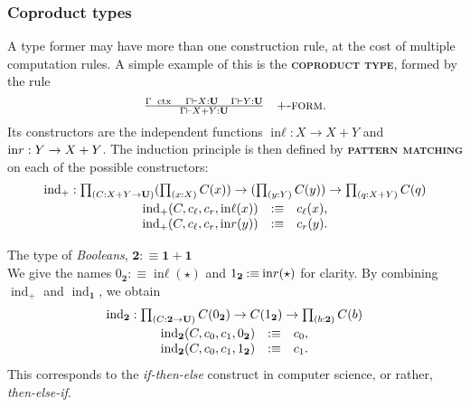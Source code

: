 \documentclass{article}
\newcommand{\defn}[1]{{\scshape\bfseries\color{MPBemph}#1}}
\newcommand{\infrule}[3]{\genfrac{}{}{}{}{#1}{#2}\hspace{1em}{\textsc{#3}}}
\DeclareMathOperator{\ctx}{~ctx}
\newcommand{\gives}{\vdash}
\newcommand{\eql}{\mathbin{:\equiv}}
\newcommand{\U}{\mathbf{U}}
\newcommand{\tpi}[1]{\prod_{(#1)}}
\DeclareMathOperator{\ind}{ind}
\newcommand{\1}{\textbf{1}}
\newcommand{\0}{\mathbf{0}}
\DeclareMathOperator{\inl}{in\ell}
\DeclareMathOperator{\inr}{in\mathnormal{r}}
\newcommand{\2}{\textbf{2}}
\begin{document}
\subsubsection{Coproduct types}
A type former may have more than one construction rule, at the cost of multiple computation rules. A simple example of this is the \defn{coproduct type}, formed by the rule
\[ \OD \infrule{\Gamma \ctx \hspace{1em} \Gamma \gives X : \U \hspace{1em} \Gamma \gives Y : \U}{\Gamma \gives X + Y : \U}{\( + \)-form}. \]
Its constructors are the independent functions \( \inl : X \to X + Y \) and \( \inr : Y \to X + Y \). The induction principle is then defined by \defn{pattern matching} on each of the possible constructors:
\[ \begin{array}{c}
	\ind_{+} : \tpi{C : X + Y \to \U} (\tpi{x : X} C(x)) \to (\tpi{y : Y} C(y)) \to \tpi{q : X + Y} C(q) \\[3pt]
	\begin{array}{rcl}
		\ind_{+}(C, c_{\ell}, c_{r}, \inl(x)) &\eql& c_{\ell}(x), \\
		\ind_{+}(C, c_{\ell}, c_{r}, \inr(y)) &\eql& c_{r}(y).
	\end{array}
\end{array} \]
\begin{example}{The type of \emph{Booleans}, \( \2 \eql \1 + \1 \)}{}\\[3pt]
	We give the names \( 0_{\2} \eql \inl(\star) \) and \( 1_{\2} \eql \inr(\star) \) for clarity. By combining \( \ind_{+} \) and \( \ind_{\1} \), we obtain\vspace{-3pt}
	\[ \begin{array}{c}
		\ind_{\2} : \tpi{C : \2 \to \U} C(0_{\2}) \to C(1_{\2}) \to \tpi{b : \2} C(b) \\[3pt]
		\begin{array}{rcl}
			\ind_{\2}(C, c_{0}, c_{1}, 0_{\2}) &\eql& c_{0}, \\
			\ind_{\2}(C, c_{0}, c_{1}, 1_{\2}) &\eql& c_{1}.
		\end{array}
	\end{array}\vspace{-3pt} \]
	This corresponds to the \emph{if-then-else} construct in computer science, or rather, \emph{then-else-if}.
\end{example}
\end{document}
